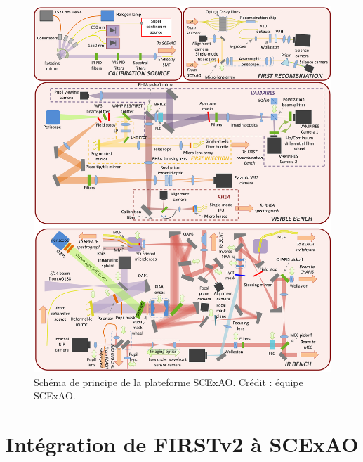 \begin{figure}[ht!]
    \centering
    \includegraphics[width=\figwidth]{Figure_Chap5/20230212_FullBench.pdf}
    \caption[Schéma de principe de la plateforme SCExAO.]{Schéma de principe de la plateforme SCExAO. Crédit : équipe SCExAO.}
    \label{fig:SCExAOScheme}
\end{figure}

% 


\section{Intégration de FIRSTv2 à SCExAO}

